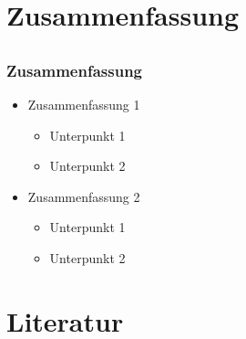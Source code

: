 \documentclass[compress]{beamer}
\begin{document}
\section{Zusammenfassung}
\subsection*{}

\begin{frame}
	\frametitle{Zusammenfassung}

	\begin{itemize}
		\item Zusammenfassung 1

		\begin{itemize}
			\item Unterpunkt 1
			\item Unterpunkt 2
		\end{itemize}

		\item Zusammenfassung 2

		\begin{itemize}
			\item Unterpunkt 1
			\item Unterpunkt 2
		\end{itemize}
	\end{itemize}
\end{frame}

\section{Literatur}
\subsection*{}

\end{document}
